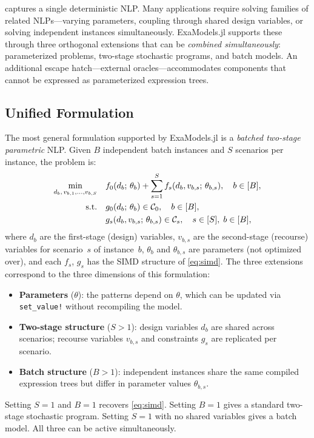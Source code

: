 \documentclass[11pt]{article}
\begin{document}
 captures a single deterministic NLP. Many applications require solving families of related NLPs---varying parameters, coupling through shared design variables, or solving independent instances simultaneously. ExaModels.jl supports these through three orthogonal extensions that can be \emph{combined simultaneously}: parameterized problems, two-stage stochastic programs, and batch models. An additional escape hatch---external oracles---accommodates components that cannot be expressed as parameterized expression trees.

\subsection{Unified Formulation}
\label{sec:extensions:formulation}

The most general formulation supported by ExaModels.jl is a \emph{batched two-stage parametric} NLP. Given $B$ independent batch instances and $S$ scenarios per instance, the problem is:
\begin{equation}\label{eq:extensions}
\begin{aligned}
  \min_{d_b,\, v_{b,1}, \ldots, v_{b,S}}\quad & f_0(d_b;\, \theta_{b}) + \sum_{s=1}^{S} f_s(d_b, v_{b,s};\, \theta_{b,s}), \quad b \in [B], \\
  \mathop{\text{\normalfont s.t.}}\quad & g_0(d_b;\, \theta_{b}) \in \mathcal{C}_0, \quad b \in [B], \\
           & g_s(d_b, v_{b,s};\, \theta_{b,s}) \in \mathcal{C}_s, \quad s \in [S],\; b \in [B],
\end{aligned}
\end{equation}
where $d_b$ are the first-stage (design) variables, $v_{b,s}$ are the second-stage (recourse) variables for scenario~$s$ of instance~$b$, $\theta_{b}$ and $\theta_{b,s}$ are parameters (not optimized over), and each $f_s$, $g_s$ has the SIMD structure of \cref{eq:simd}. The three extensions correspond to the three dimensions of this formulation:
\begin{itemize}
  \item \textbf{Parameters} ($\theta$): the patterns depend on $\theta$, which can be updated via \texttt{set\_value!} without recompiling the model.
  \item \textbf{Two-stage structure} ($S > 1$): design variables $d_b$ are shared across scenarios; recourse variables $v_{b,s}$ and constraints $g_s$ are replicated per scenario.
  \item \textbf{Batch structure} ($B > 1$): independent instances share the same compiled expression trees but differ in parameter values $\theta_{b,s}$.
\end{itemize}
Setting $S = 1$ and $B = 1$ recovers \cref{eq:simd}. Setting $B = 1$ gives a standard two-stage stochastic program. Setting $S = 1$ with no shared variables gives a batch model. All three can be active simultaneously.
\end{document}

